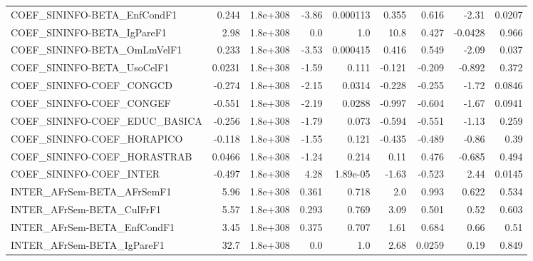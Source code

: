\begin{tabular}{lrrrrrrrr}
COEF\_SININFO-BETA\_EnfCondF1           &       0.244 &     1.8e+308 &   -3.86 & 0.000113 &      0.355 &       0.616 &        -2.31 &        0.0207 \\
COEF\_SININFO-BETA\_IgPareF1            &        2.98 &     1.8e+308 &     0.0 &      1.0 &       10.8 &       0.427 &      -0.0428 &         0.966 \\
COEF\_SININFO-BETA\_OmLmVelF1           &       0.233 &     1.8e+308 &   -3.53 & 0.000415 &      0.416 &       0.549 &        -2.09 &         0.037 \\
COEF\_SININFO-BETA\_UsoCelF1            &      0.0231 &     1.8e+308 &   -1.59 &    0.111 &     -0.121 &      -0.209 &       -0.892 &         0.372 \\
COEF\_SININFO-COEF\_CONGCD              &      -0.274 &     1.8e+308 &   -2.15 &   0.0314 &     -0.228 &      -0.255 &        -1.72 &        0.0846 \\
COEF\_SININFO-COEF\_CONGEF              &      -0.551 &     1.8e+308 &   -2.19 &   0.0288 &     -0.997 &      -0.604 &        -1.67 &        0.0941 \\
COEF\_SININFO-COEF\_EDUC\_BASICA         &      -0.256 &     1.8e+308 &   -1.79 &    0.073 &     -0.594 &      -0.551 &        -1.13 &         0.259 \\
COEF\_SININFO-COEF\_HORAPICO            &      -0.118 &     1.8e+308 &   -1.55 &    0.121 &     -0.435 &      -0.489 &        -0.86 &          0.39 \\
COEF\_SININFO-COEF\_HORASTRAB           &      0.0466 &     1.8e+308 &   -1.24 &    0.214 &       0.11 &       0.476 &       -0.685 &         0.494 \\
COEF\_SININFO-COEF\_INTER               &      -0.497 &     1.8e+308 &    4.28 & 1.89e-05 &      -1.63 &      -0.523 &         2.44 &        0.0145 \\
INTER\_AFrSem-BETA\_AFrSemF1            &        5.96 &     1.8e+308 &   0.361 &    0.718 &        2.0 &       0.993 &        0.622 &         0.534 \\
INTER\_AFrSem-BETA\_CulFrF1             &        5.57 &     1.8e+308 &   0.293 &    0.769 &       3.09 &       0.501 &         0.52 &         0.603 \\
INTER\_AFrSem-BETA\_EnfCondF1           &        3.45 &     1.8e+308 &   0.375 &    0.707 &       1.61 &       0.684 &         0.66 &          0.51 \\
INTER\_AFrSem-BETA\_IgPareF1            &        32.7 &     1.8e+308 &     0.0 &      1.0 &       2.68 &      0.0259 &         0.19 &         0.849 \\

\end{tabular}
